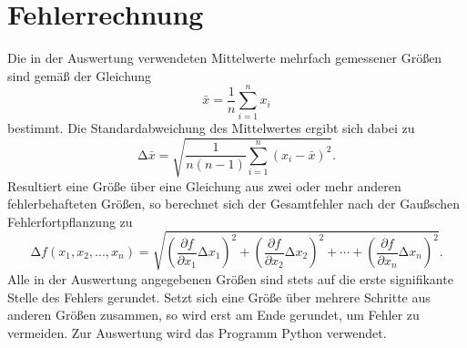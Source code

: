 \documentclass[
  bibliography=totoc,     %
  captions=tableheading,  %
  titlepage=firstiscover, %
]{scrartcl}
\begin{document}
\section{Fehlerrechnung}
\label{sec:fehlerrechnung}
Die in der Auswertung verwendeten Mittelwerte mehrfach gemessener Größen sind gemäß der
Gleichung
\begin{equation}
    \bar{x}=\frac{1}{n}\sum_{i=1}^n x_i
    \label{eqn:mittelwert}
\end{equation}
\noindent
bestimmt. Die Standardabweichung des Mittelwertes ergibt sich dabei zu
\begin{equation}
    \mathup{\Delta}\bar{x}=\sqrt{\frac{1}{n(n-1)}\sum_{i=1}^n\left(x_i-\bar{x}\right)^2}.
    \label{eqn:standardabweichung}
\end{equation}
\noindent
Resultiert eine Größe über eine Gleichung aus zwei oder mehr anderen fehlerbehafteten Größen, so
berechnet sich der Gesamtfehler nach der Gaußschen Fehlerfortpflanzung zu
\begin{equation}
    \mathup{\Delta}f(x_1,x_2,...,x_n)=\sqrt{\left(\frac{\partial f}{\partial x_1}\mathup{\Delta}x_1\right)^2+\left(\frac{\partial f}{\partial x_2}\mathup{\Delta}x_2\right)^2+ \dotsb +\left(\frac{\partial f}{\partial x_n}\mathup{\Delta}x_n\right)^2}.
    \label{eqn:fehlerfortpflanzung}
\end{equation}
\noindent
Alle in der Auswertung angegebenen Größen sind stets auf die erste signifikante Stelle des
Fehlers gerundet. Setzt sich eine Größe über mehrere Schritte aus anderen Größen zusammen,
so wird erst am Ende gerundet, um Fehler zu vermeiden. Zur Auswertung wird das Programm Python verwendet.
\clearpage
\end{document}
